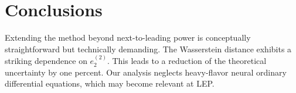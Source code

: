 \section{Conclusions}\label{sec:conclusions}

Extending the method beyond next-to-leading power is conceptually
straightforward but technically demanding. The Wasserstein distance
exhibits a striking dependence on $e_2^{(2)}$. This leads to a reduction
of the theoretical uncertainty by one percent. Our analysis neglects
heavy-flavor neural ordinary differential equations, which may become
relevant at LEP.

